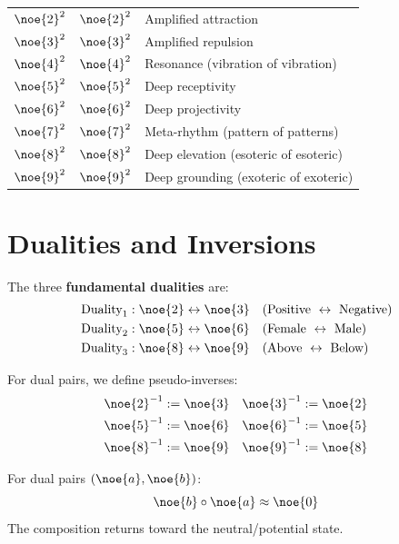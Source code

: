\begin{longtable}{lll}
\midrule
$\noe{2}^2$ & $\noe{2}^2$ & Amplified attraction \\
$\noe{3}^2$ & $\noe{3}^2$ & Amplified repulsion \\
$\noe{4}^2$ & $\noe{4}^2$ & Resonance (vibration of vibration) \\
$\noe{5}^2$ & $\noe{5}^2$ & Deep receptivity \\
$\noe{6}^2$ & $\noe{6}^2$ & Deep projectivity \\
$\noe{7}^2$ & $\noe{7}^2$ & Meta-rhythm (pattern of patterns) \\
$\noe{8}^2$ & $\noe{8}^2$ & Deep elevation (esoteric of esoteric) \\
$\noe{9}^2$ & $\noe{9}^2$ & Deep grounding (exoteric of exoteric) \\
\bottomrule
\end{longtable}

\section{Dualities and Inversions}

\begin{definition}
\label{def:dual-noetics}
The three \textbf{fundamental dualities} are:
\begin{align}
\text{Duality}_1 &: \noe{2} \leftrightarrow \noe{3} && \text{(Positive } \leftrightarrow \text{ Negative)} \\
\text{Duality}_2 &: \noe{5} \leftrightarrow \noe{6} && \text{(Female } \leftrightarrow \text{ Male)} \\
\text{Duality}_3 &: \noe{8} \leftrightarrow \noe{9} && \text{(Above } \leftrightarrow \text{ Below)}
\end{align}
\end{definition}

\begin{axiom}
\label{ax:pseudo-inverse}
For dual pairs, we define pseudo-inverses:
\begin{align}
\noe{2}^{-1} &:= \noe{3} & \noe{3}^{-1} &:= \noe{2} \\
\noe{5}^{-1} &:= \noe{6} & \noe{6}^{-1} &:= \noe{5} \\
\noe{8}^{-1} &:= \noe{9} & \noe{9}^{-1} &:= \noe{8}
\end{align}
\end{axiom}

\begin{theorem}
\label{thm:duality-neutral}
For dual pairs $(\noe{a}, \noe{b})$:
\[
\noe{b} \circ \noe{a} \approx \noe{0}
\]
The composition returns toward the neutral/potential state.
\end{theorem}

